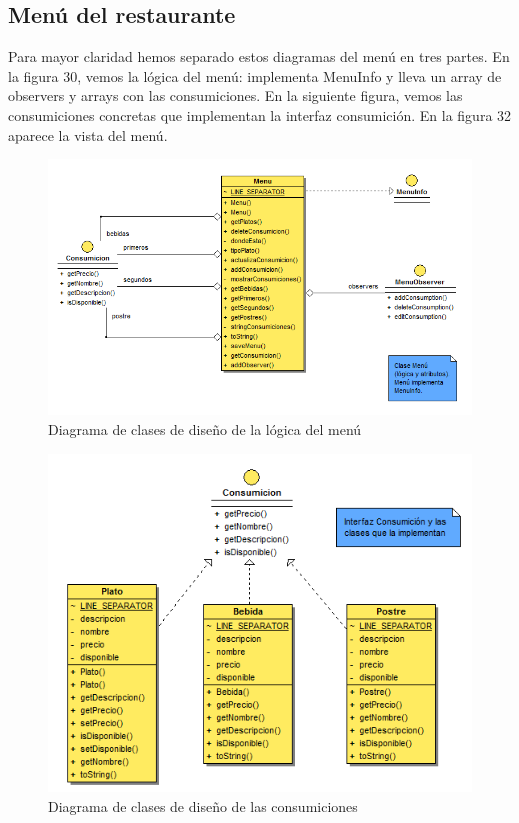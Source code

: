 \documentclass[spanish,a4paper,11pt, twoside]{report}	%
\begin{document}
		\subsection{Menú del restaurante}
		Para mayor claridad hemos separado estos diagramas del menú en tres partes. En la figura 30, vemos la lógica del menú: implementa MenuInfo y lleva un array de observers y arrays con las consumiciones. En la siguiente figura, vemos las consumiciones concretas que implementan la interfaz consumición. En la figura 32 aparece la vista del menú.  
		\begin{figure}[!h]
		\centering
		\includegraphics[scale=0.5]{DCDmenu.png}
		\caption{Diagrama de clases de diseño de la lógica del menú}
		\end{figure}

		\begin{figure}[!h]
		\centering
		\includegraphics[scale=0.5]{DCDconsumicion.png}
		\caption{Diagrama de clases de diseño de las consumiciones}
		\end{figure}
\end{document}
